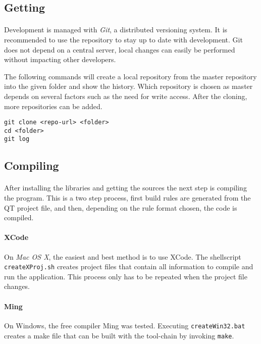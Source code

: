 \subsection{Getting \ER}
\paragraph{}
Development is managed with \textit{Git}\cite{git}, a distributed versioning system.
It is recommended to use the repository to stay up to date with development.
Git does not depend on a central server, local changes can easily be performed without impacting other developers.

The following commands will create a local repository from the master repository into the given folder and show the history.
Which repository is chosen as master depends on several factors such as the need for write access.
After the cloning, more repositories can be added.

\begin{verbatim}
git clone <repo-url> <folder>
cd <folder>
git log
\end{verbatim}


\subsection{Compiling}
\paragraph{}
After installing the libraries and getting the sources the next step is compiling the program.
This is a two step process, first build rules are generated from the QT project file, and then, depending on the rule format chosen, the code is compiled.

\paragraph{XCode}
On \textit{Mac OS X}, the easiest and best method is to use XCode.
The shellscript \texttt{createXProj.sh} creates project files that contain all information to compile and run the application.
This process only has to be repeated when the project file changes.

\paragraph{Ming}
On Windows, the free compiler Ming was tested.
Executing \texttt{createWin32.bat} creates a make file that can be built with the tool-chain by invoking \texttt{make}.

